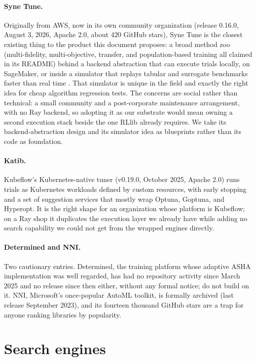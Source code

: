 \paragraph{Syne Tune.}
Originally from AWS, now in its own community organization (release
0.16.0, August 3, 2026, Apache 2.0, about 420 GitHub stars), Syne Tune is
the closest existing thing to the product this document proposes: a broad
method zoo (multi-fidelity, multi-objective, transfer, and
population-based training all claimed in its README) behind a backend
abstraction that can execute trials locally, on SageMaker, or inside a
simulator that replays tabular and surrogate benchmarks faster than real
time \citep{salinas2022synetune}. That simulator is unique in the field
and exactly the right idea for cheap algorithm regression tests. The
concerns are social rather than technical: a small community and a
post-corporate maintenance arrangement, with no Ray backend, so adopting
it as our substrate would mean owning a second execution stack beside the
one RLlib already requires. We take its backend-abstraction design and its
simulator idea as blueprints rather than its code as foundation.

\paragraph{Katib.}
Kubeflow's Kubernetes-native tuner (v0.19.0, October 2025, Apache 2.0)
runs trials as Kubernetes workloads defined by custom resources, with
early stopping and a set of suggestion services that mostly wrap Optuna,
Goptuna, and Hyperopt. It is the right shape for an organization whose
platform is Kubeflow; on a Ray shop it duplicates the execution layer we
already have while adding no search capability we could not get from the
wrapped engines directly.

\paragraph{Determined and NNI.}
Two cautionary entries. Determined, the training platform whose adaptive
ASHA implementation was well regarded, has had no repository activity
since March 2025 and no release since then either, without any formal
notice; do not build on it. NNI, Microsoft's once-popular AutoML toolkit,
is formally archived (last release September 2023), and its fourteen
thousand GitHub stars are a trap for anyone ranking libraries by
popularity.

\section{Search engines}

